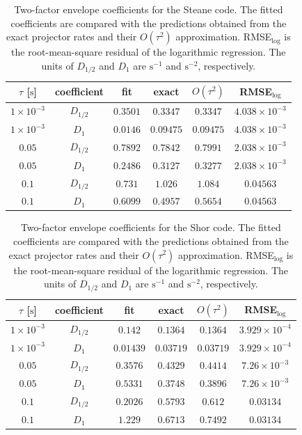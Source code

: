 \begin{table}[h]
    \centering
    \caption{Two-factor envelope coefficients for the Steane code. The fitted coefficients are compared with the
    predictions obtained from the exact projector rates and their
    $O(\tau^2)$ approximation. RMSE$_{\log}$ is the root-mean-square residual
    of the logarithmic regression. The units of $D_{1/2}$ and $D_1$ are
    $\mathrm{s}^{-1}$ and $\mathrm{s}^{-2}$, respectively.}
    \label{tab:sensitivity-factors-steane}
    \begin{tabular}{|c|c|c|c|c|c|}
        \hline
        $\tau$ [$\mathrm{s}$] & coefficient & fit & exact & $O(\tau^2)$ & RMSE$_{\log}$ \\
        \hline
        $1\times10^{-3}$ & $D_{1/2}$ & $0.3501$ & $0.3347$ & $0.3347$ & $4.038\times10^{-3}$ \\
        $1\times10^{-3}$ & $D_1$ & $0.0146$ & $0.09475$ & $0.09475$ & $4.038\times10^{-3}$ \\
        $0.05$ & $D_{1/2}$ & $0.7892$ & $0.7842$ & $0.7991$ & $2.038\times10^{-3}$ \\
        $0.05$ & $D_1$ & $0.2486$ & $0.3127$ & $0.3277$ & $2.038\times10^{-3}$ \\
        $0.1$ & $D_{1/2}$ & $0.731$ & $1.026$ & $1.084$ & $0.04563$ \\
        $0.1$ & $D_1$ & $0.6099$ & $0.4957$ & $0.5654$ & $0.04563$ \\
        \hline
    \end{tabular}
\end{table}

\begin{table}[h]
    \centering
    \caption{Two-factor envelope coefficients for the Shor code. The fitted coefficients are compared with the
    predictions obtained from the exact projector rates and their
    $O(\tau^2)$ approximation. RMSE$_{\log}$ is the root-mean-square residual
    of the logarithmic regression. The units of $D_{1/2}$ and $D_1$ are
    $\mathrm{s}^{-1}$ and $\mathrm{s}^{-2}$, respectively.}
    \label{tab:sensitivity-factors-shor}
    \begin{tabular}{|c|c|c|c|c|c|}
        \hline
        $\tau$ [$\mathrm{s}$] & coefficient & fit & exact & $O(\tau^2)$ & RMSE$_{\log}$ \\
        \hline
        $1\times10^{-3}$ & $D_{1/2}$ & $0.142$ & $0.1364$ & $0.1364$ & $3.929\times10^{-4}$ \\
        $1\times10^{-3}$ & $D_1$ & $0.01439$ & $0.03719$ & $0.03719$ & $3.929\times10^{-4}$ \\
        $0.05$ & $D_{1/2}$ & $0.3576$ & $0.4329$ & $0.4414$ & $7.26\times10^{-3}$ \\
        $0.05$ & $D_1$ & $0.5331$ & $0.3748$ & $0.3896$ & $7.26\times10^{-3}$ \\
        $0.1$ & $D_{1/2}$ & $0.2026$ & $0.5793$ & $0.612$ & $0.03134$ \\
        $0.1$ & $D_1$ & $1.229$ & $0.6713$ & $0.7492$ & $0.03134$ \\
        \hline
    \end{tabular}
\end{table}
